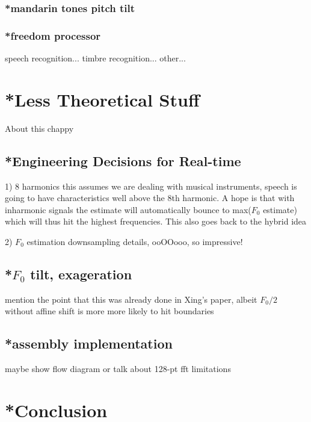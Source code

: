 \documentclass [11pt, proquest] {uwthesis}[2015/03/03]
\begin{document}
	\subsection{*mandarin tones pitch tilt}
	
	\subsection{*freedom processor}
		speech recognition...
		timbre recognition...
		other...


 
\chapter{*Less Theoretical Stuff}

About this chappy

\section{*Engineering Decisions for Real-time}

1) 8 harmonics
this assumes we are dealing with musical instruments, speech is going to have characteristics well above the 8th harmonic.  A hope is that with inharmonic signals the estimate will automatically bounce to max($F_0$ estimate) which will thus hit the highest frequencies.  This also goes back to the hybrid idea


2) $F_0$ estimation downsampling details, ooOOooo, so impressive!

\section{*$F_0$ tilt, exageration}

mention the point that this was already done in Xing's paper, albeit $F_0/2$ without affine shift is more more likely to hit boundaries 

\section{*assembly implementation}

maybe show flow diagram or talk about 128-pt fft limitations




\chapter{*Conclusion}
\end{document}

